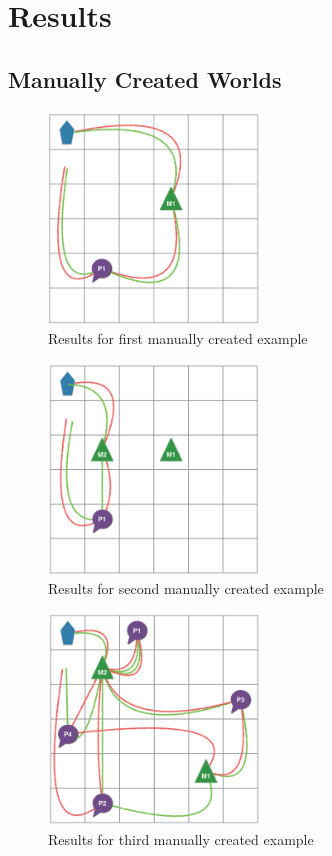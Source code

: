 \section{Results}
\label{sec:results}

\subsection{Manually Created Worlds}

\begin{figure}[!hbt]
  \centering
  \includegraphics[width=0.5\textwidth]{img/t1}
  \caption{Results for first manually created example}
  \label{fig:t1}
\end{figure}

\begin{figure}[!hbt]
  \centering
  \includegraphics[width=0.5\textwidth]{img/t2}
  \caption{Results for second manually created example}
  \label{fig:t2}
\end{figure}

\begin{figure}[!hbt]
  \centering
  \includegraphics[width=0.5\textwidth]{img/t3}
  \caption{Results for third manually created example}
  \label{fig:t3}
\end{figure}


